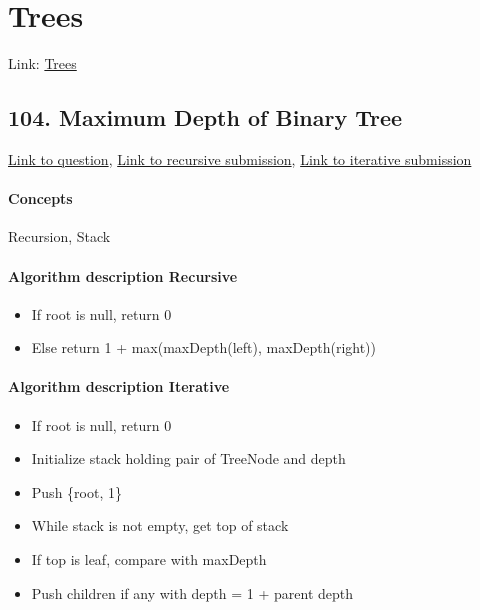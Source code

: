 \documentclass[11pt]{book}
\begin{document}
\newpage

\section{Trees}
Link: \href{https://leetcode.com/explore/interview/card/top-interview-questions-easy/94/trees/}{Trees}

\subsection{104. Maximum Depth of Binary Tree}
\href{https://leetcode.com/problems/maximum-depth-of-binary-tree/}{Link to question},
\href{https://leetcode.com/submissions/detail/334227706/}{Link to recursive submission},
\href{https://leetcode.com/submissions/detail/334260483/}{Link to iterative submission}
\paragraph{Concepts}
Recursion, Stack
\paragraph{Algorithm description Recursive}
\begin{itemize}
    \item If root is null, return 0
    \item Else return 1 + max(maxDepth(left), maxDepth(right))
\end{itemize}
\paragraph{Algorithm description Iterative}
\begin{itemize}
    \item If root is null, return 0
    \item Initialize stack holding pair of TreeNode and depth
    \item Push \{root, 1\}
    \item While stack is not empty, get top of stack
    \item If top is leaf, compare with maxDepth
    \item Push children if any with depth = 1 + parent depth
\end{itemize}
\end{document}
